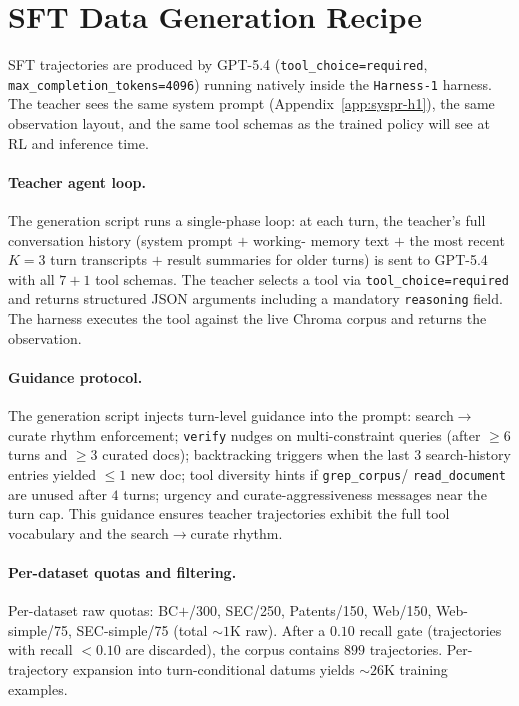 \documentclass{article}
\newcommand{\sys}{\texttt{Harness-1}\xspace}
\newcommand{\verify}{\texttt{verify}\xspace}
\begin{document}
\section{SFT Data Generation Recipe}
\label{app:sft-gen}

SFT trajectories are produced by GPT-5.4
(\texttt{tool\_choice=required},
\texttt{max\_completion\_tokens=4096}) running natively inside
the \sys harness. The teacher sees the same system prompt
(Appendix~\ref{app:syspr-h1}), the same observation layout, and
the same tool schemas as the trained policy will see at RL and
inference time.

\paragraph{Teacher agent loop.}
The generation script runs a single-phase loop: at each turn, the
teacher's full conversation history (system prompt $+$ working-
memory text $+$ the most recent $K{=}3$ turn transcripts $+$
result summaries for older turns) is sent to GPT-5.4 with all
$7{+}1$ tool schemas. The teacher selects a tool via
\texttt{tool\_choice=required} and returns structured JSON
arguments including a mandatory \texttt{reasoning} field. The
harness executes the tool against the live Chroma corpus and
returns the observation.

\paragraph{Guidance protocol.} The generation script injects
turn-level guidance into the prompt: search$\to$curate rhythm
enforcement; \verify nudges on multi-constraint queries (after
$\geq 6$ turns and $\geq 3$ curated docs); backtracking triggers
when the last $3$ search-history entries yielded $\leq 1$ new
doc; tool diversity hints if \texttt{grep\_corpus}/
\texttt{read\_document} are unused after $4$ turns; urgency and
curate-aggressiveness messages near the turn cap. This guidance
ensures teacher trajectories exhibit the full tool vocabulary
and the search$\to$curate rhythm.

\paragraph{Per-dataset quotas and filtering.} Per-dataset raw
quotas: BC$+$/300, SEC/250, Patents/150, Web/150, Web-simple/75,
SEC-simple/75 (total ${\sim}1$K raw). After a $0.10$ recall gate
(trajectories with recall $<0.10$ are discarded), the corpus
contains $899$ trajectories. Per-trajectory expansion into
turn-conditional datums yields ${\sim}26$K training examples.
\end{document}
